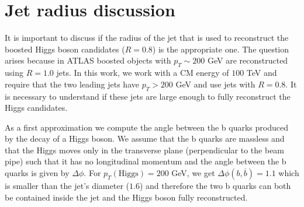 
\chapter{Jet radius discussion}
\label{chapter:jetrad}

It is important to discuss if the radius of the jet that is used to reconstruct the boosted Higgs boson candidates ($R=0.8$) is the appropriate one. The question arises because in ATLAS boosted objects with $p_T\sim 200$ GeV are reconstructed using $R=1.0$ jets. In this work, we work with a CM energy of $100$ TeV and require that the two leading jets have $p_T>200$ GeV and use jets with $R=0.8$. It is necessary to understand if these jets are large enough to fully reconstruct the Higgs candidates. 

As a first approximation we compute the angle between the b quarks produced by the decay of a Higgs boson. We assume that the b quarks are massless and that the Higgs moves only in the transverse plane (perpendicular to the beam pipe) such that it has no longitudinal momentum and the angle between the b quarks is given by $\Delta\phi$. For $p_T(\text{Higgs})=200$ GeV, we get $\Delta\phi(b,\overline{b})=1.1$ which is smaller than the jet's diameter ($1.6$) and therefore the two b quarks can both be contained inside the jet and the Higgs boson fully reconstructed.


